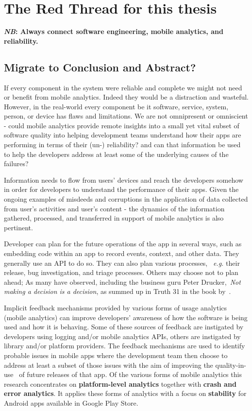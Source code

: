 \section{The Red Thread for this thesis}
\label{section_read_thread}
\textbf{\textit{NB}: Always connect software engineering, mobile analytics, and reliability.}

\subsection{Migrate to Conclusion and Abstract?}
If every component in the system were reliable and complete we might not need or benefit from mobile analytics. Indeed they would be a distraction and wasteful. However, in the real-world every component be it software, service, system, person, or device has flaws and limitations. We are not omnipresent or omniscient - could mobile analytics provide remote insights into a small yet vital subset of software quality into helping development teams understand how their apps are performing in terms of their (un-) reliability? and can that information be used to help the developers address at least some of the underlying causes of the failures?

Information needs to flow from users' devices and reach the developers somehow in order for developers to understand the performance of their apps. Given the ongoing examples of misdeeds and corruptions in the application of data collected from user's activities and user's content - the dynamics of the information gathered, processed, and transferred in support of mobile analytics is also pertinent. 

Developer can plan for the future operations of the app in several ways, such as embedding code within an app to record events, context, and other data. They generally use an API to do so. They can also plan various processes, ~\emph{e.g.} their release, bug investigation, and triage processes. Others may choose not to plan ahead; As many have observed, including the business guru Peter Drucker,~\emph{Not making a decision is a decision}, as summed up in Truth 31 in the book by~\cite{gunther2013truth_about_better_decision_making}.

Implicit feedback mechanisms provided by various forms of usage analytics (mobile analytics) can improve developers' awareness of how the software is being used and how it is behaving. Some of these sources of feedback are instigated by developers using logging and/or mobile analytics APIs, others are instigated by library and/or platform providers. The feedback mechanisms are used to identify probable issues in mobile apps where the development team then choose to address at least a subset of those issues with the aim of improving the quality-in-use~\citep{} of future releases of that app. Of the various forms of mobile analytics this research concentrates on \textbf{platform-level analytics} together with \textbf{crash and error analytics}. It applies these forms of analytics with a focus on \textbf{stability} for Android apps available in Google Play Store.

